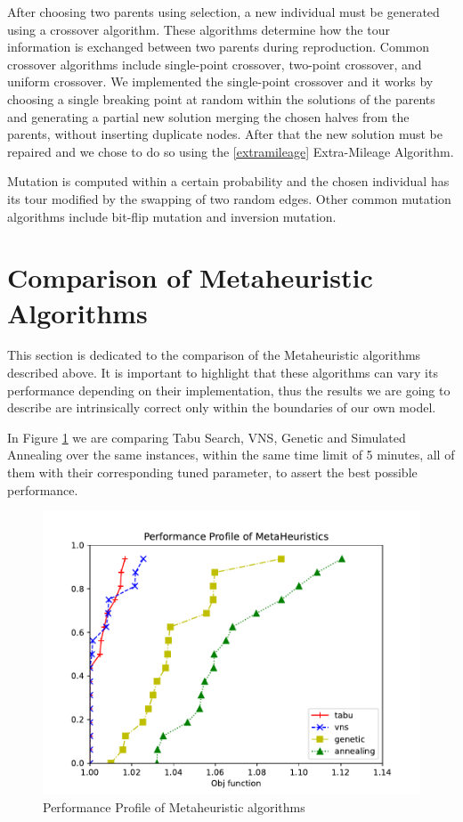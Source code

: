 After choosing two parents using selection, a new individual must be generated using a crossover algorithm. 
These algorithms determine how the tour information is exchanged between two parents during reproduction. Common crossover algorithms include single-point crossover, two-point crossover, and uniform crossover.
We implemented the single-point crossover and it works by choosing a single breaking point at random within the solutions of the parents and generating a partial new solution merging the chosen halves from the parents, without inserting duplicate nodes.
After that the new solution must be repaired and we chose to do so using the \ref{extramileage} Extra-Mileage Algorithm.

Mutation is computed within a certain probability and the chosen individual has its tour modified by the swapping of two random edges. Other common mutation algorithms include bit-flip mutation and inversion mutation.



\section{Comparison of Metaheuristic Algorithms}
This section is dedicated to the comparison of the Metaheuristic algorithms described above. 
It is important to highlight that these algorithms can vary its performance depending on their implementation, thus the results we are going to describe are intrinsically correct only within the boundaries of our own model.

In Figure \ref{fig:meta} we are comparing Tabu Search, VNS, Genetic and Simulated Annealing over the same instances, within the same time limit of 5 minutes, all of them with their corresponding tuned parameter, to assert the best possible performance.



\begin{figure}[!h]
    \centering
    \includegraphics[width=\textwidth]{images/meta.pdf}
    \caption{Performance Profile of Metaheuristic algorithms}
    \label{fig:meta}
\end{figure}


